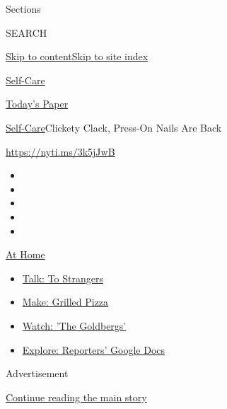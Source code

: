 Sections

SEARCH

\protect\hyperlink{site-content}{Skip to
content}\protect\hyperlink{site-index}{Skip to site index}

\href{https://www.nytimes.com/section/style/self-care/}{Self-Care}

\href{https://myaccount.nytimes.com/auth/login?response_type=cookie\&client_id=vi}{}

\href{https://www.nytimes.com/section/todayspaper}{Today's Paper}

\href{/section/style/self-care/}{Self-Care}\textbar{}Clickety Clack,
Press-On Nails Are Back

\url{https://nyti.ms/3k5jJwB}

\begin{itemize}
\item
\item
\item
\item
\item
\end{itemize}

\href{https://www.nytimes.com/spotlight/at-home?action=click\&pgtype=Article\&state=default\&region=TOP_BANNER\&context=at_home_menu}{At
Home}

\begin{itemize}
\tightlist
\item
  \href{https://www.nytimes.com/2020/08/03/well/family/the-benefits-of-talking-to-strangers.html?action=click\&pgtype=Article\&state=default\&region=TOP_BANNER\&context=at_home_menu}{Talk:
  To Strangers}
\item
  \href{https://www.nytimes.com/2020/08/01/at-home/coronavirus-make-pizza-on-a-grill.html?action=click\&pgtype=Article\&state=default\&region=TOP_BANNER\&context=at_home_menu}{Make:
  Grilled Pizza}
\item
  \href{https://www.nytimes.com/2020/07/31/arts/television/goldbergs-abc-stream.html?action=click\&pgtype=Article\&state=default\&region=TOP_BANNER\&context=at_home_menu}{Watch:
  'The Goldbergs'}
\item
  \href{https://www.nytimes.com/interactive/2020/at-home/even-more-reporters-editors-diaries-lists-recommendations.html?action=click\&pgtype=Article\&state=default\&region=TOP_BANNER\&context=at_home_menu}{Explore:
  Reporters' Google Docs}
\end{itemize}

Advertisement

\protect\hyperlink{after-top}{Continue reading the main story}


